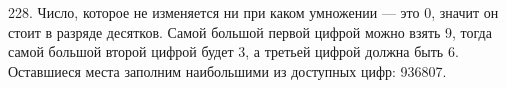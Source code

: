 228. Число, которое не изменяется ни при каком умножении --- это 0, значит он стоит в разряде десятков. Самой большой первой цифрой можно взять 9, тогда самой большой второй цифрой будет 3, а третьей цифрой должна быть 6. Оставшиеся места заполним наибольшими из доступных цифр: 936807.\\
